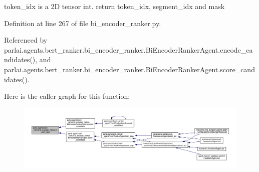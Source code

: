 \begin{DoxyVerb}token_idx is a 2D tensor int.
    return token_idx, segment_idx and mask
\end{DoxyVerb}
 

Definition at line 267 of file bi\+\_\+encoder\+\_\+ranker.\+py.



Referenced by parlai.\+agents.\+bert\+\_\+ranker.\+bi\+\_\+encoder\+\_\+ranker.\+Bi\+Encoder\+Ranker\+Agent.\+encode\+\_\+candidates(), and parlai.\+agents.\+bert\+\_\+ranker.\+bi\+\_\+encoder\+\_\+ranker.\+Bi\+Encoder\+Ranker\+Agent.\+score\+\_\+candidates().

Here is the caller graph for this function\+:
\nopagebreak
\begin{figure}[H]
\begin{center}
\leavevmode
\includegraphics[width=350pt]{namespaceparlai_1_1agents_1_1bert__ranker_1_1bi__encoder__ranker_afd88e1e1699d975ab19ea38e8ae77e20_icgraph}
\end{center}
\end{figure}

